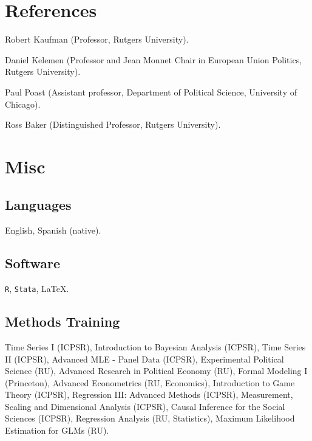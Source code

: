 \documentclass[letterpaper]{article}
\renewenvironment{itemize}{
  \begin{list}{}{
    \setlength{\leftmargin}{1.5em}
  }
}{
  \end{list}
}
\begin{document}
\section*{References}
\begin{itemize}
\item[$\bullet$] Robert Kaufman {\scriptsize(Professor, Rutgers University).}
\item[$\bullet$] Daniel Kelemen {\scriptsize(Professor and Jean Monnet Chair in
European Union Politics, Rutgers University).}
\item[$\bullet$] Paul Poast {\scriptsize(Assistant professor, Department of Political Science, University of Chicago).}
\item[$\bullet$] Ross Baker {\scriptsize(Distinguished Professor, Rutgers University).}
\end{itemize}


\section*{Misc}

\subsection*{Languages}
English, Spanish (native).


\subsection*{Software}
\texttt{R}, \texttt{Stata}, \LaTeX.

\subsection*{Methods Training}
Time Series I (ICPSR), Introduction to Bayesian Analysis (ICPSR), Time Series II (ICPSR), Advanced MLE - Panel Data (ICPSR), Experimental Political Science (RU), Advanced Research in Political Economy (RU), Formal Modeling I (Princeton), Advanced Econometrics (RU, Economics), Introduction to Game Theory (ICPSR), Regression III: Advanced Methods (ICPSR), Measurement, Scaling and Dimensional Analysis (ICPSR), Causal Inference for the Social Sciences (ICPSR), Regression Analysis (RU, Statistics), Maximum Likelihood Estimation for GLMs (RU).




\bigskip
\end{document}
